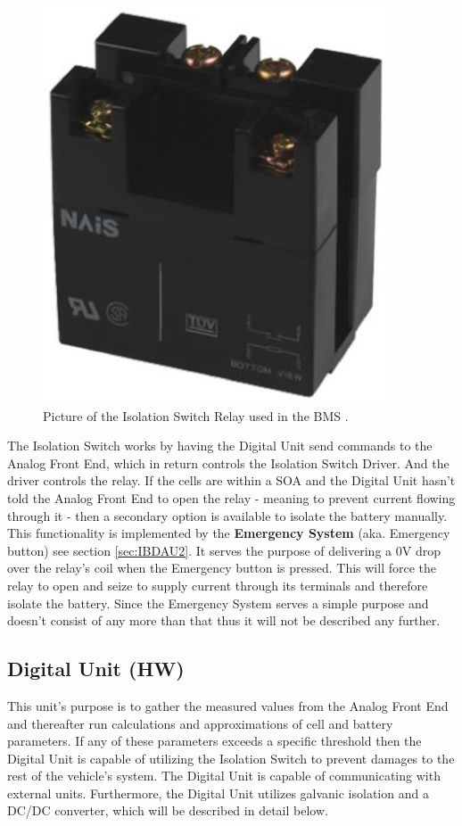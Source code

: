 \begin{figure}[H]
	\centering
	\includegraphics[width=0.3\linewidth]{Hardware/Pictures/BMSRelay}
	\caption[Empty]{Picture of the Isolation Switch Relay used in the BMS \cite{IsolationSwitchOnline}.}
	\label{fig:BMSRelay}
\end{figure}

The Isolation Switch works by having the Digital Unit send commands to the Analog Front End, which in return controls the Isolation Switch Driver. And the driver controls the relay. If the cells are within a SOA and the Digital Unit hasn't told the Analog Front End to open the relay - meaning to prevent current flowing through it - then a secondary option is available to isolate the battery manually. This functionality is implemented by the \textbf{Emergency System} (aka. Emergency button) see section \vref{sec:IBDAU2}. It serves the purpose of delivering a 0V drop over the relay's coil when the Emergency button is pressed. This will force the relay to open and seize to supply current through its terminals and therefore isolate the battery. Since the Emergency System serves a simple purpose and doesn't consist of any more than that thus it will not be described any further.

\subsection{Digital Unit (HW)}
This unit's purpose is to gather the measured values from the Analog Front End and thereafter run calculations and approximations of cell and battery parameters. If any of these parameters exceeds a specific threshold then the Digital Unit is capable of utilizing the Isolation Switch to prevent damages to the rest of the vehicle's system. The Digital Unit is capable of communicating with external units. Furthermore, the Digital Unit utilizes galvanic isolation and a DC/DC converter, which will be described in detail below. 


